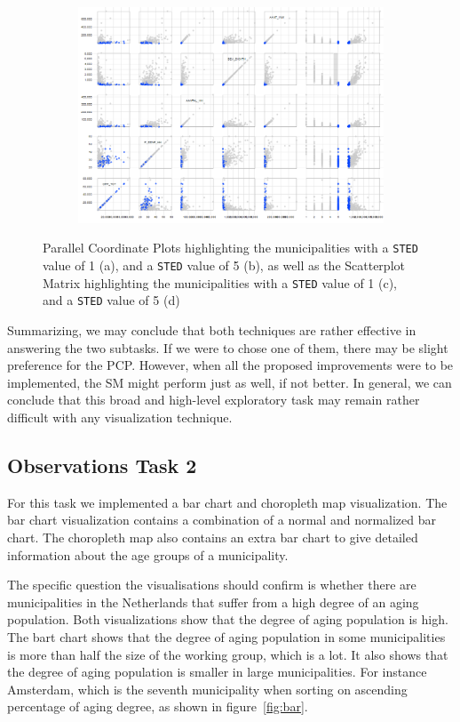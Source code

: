 \begin{figure}[h!]
\begin{subfigure}[t]{0.48\textwidth}
        \caption{ }
    \end{subfigure}
    \begin{subfigure}[t]{0.48\textwidth}
        \includegraphics[width=\textwidth]{img/sm_STED5.png}
        \caption{ }
    \end{subfigure}
    \caption{Parallel Coordinate Plots highlighting the municipalities with a \texttt{STED} value of 1 (a), and a \texttt{STED} value of 5 (b), as well as the Scatterplot Matrix highlighting the municipalities with a \texttt{STED} value of 1 (c), and a \texttt{STED} value of 5 (d)}
    \label{fig:sted}
\end{figure}

Summarizing, we may conclude that both techniques are rather effective in answering the two subtasks. If we were to chose one of them, there may be  slight preference for the PCP. However, when all the proposed improvements were to be implemented, the SM might perform just as well, if not better. In general, we can conclude that this broad and high-level exploratory task may remain rather difficult with any visualization technique.


\subsection{Observations Task 2}
For this task we implemented a bar chart and choropleth map visualization.
The bar chart visualization contains a combination of a normal and normalized bar chart.
The choropleth map also contains an extra bar chart to give detailed information about the age groups of a municipality.

The specific question the visualisations should confirm is whether there are municipalities in the Netherlands that suffer from a high degree of an aging population.
Both visualizations show that the degree of aging population is high.
The bart chart shows that the degree of aging population in some municipalities is more than half the size of the working group, which is a lot.
It also shows that the degree of aging population is smaller in large municipalities.
For instance Amsterdam, which is the seventh municipality when sorting on ascending percentage of aging degree, as shown in figure~\ref{fig:bar}.

